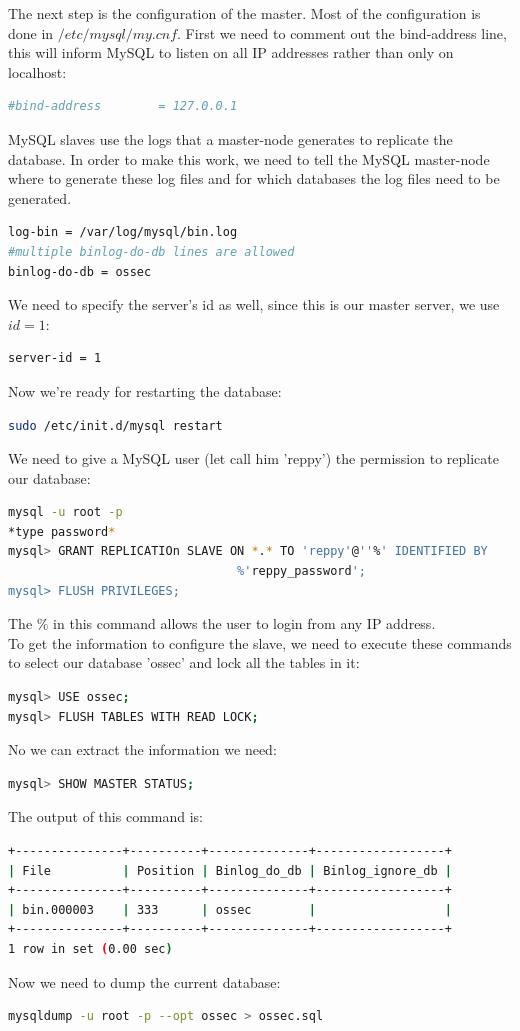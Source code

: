 \documentclass[12pt]{report}
\begin{document}
The next step is the configuration of the master. Most of the
configuration is done in $/etc/mysql/my.cnf$.
First we need to comment out the bind-address line, this will inform MySQL
to listen on all IP addresses rather than only on localhost:
\begin{lstlisting}[language=bash]
#bind-address        = 127.0.0.1
\end{lstlisting}
MySQL slaves use the logs that a master-node generates to replicate
the database. In order to make this work, we need to tell the MySQL
master-node where to
generate these log files and for which databases the log files need to
be generated. 
\begin{lstlisting}[language=bash]
log-bin = /var/log/mysql/bin.log
#multiple binlog-do-db lines are allowed
binlog-do-db = ossec
\end{lstlisting}
We need to specify the server's id as well, since this is our master
server, we use $id=1$:
\begin{lstlisting}[language=bash]
server-id = 1
\end{lstlisting}
Now we're ready for restarting the database:
\begin{lstlisting}[language=bash]
sudo /etc/init.d/mysql restart
\end{lstlisting}
We need to give a MySQL user (let call him 'reppy') the permission to replicate our
database:
\begin{lstlisting}[language=bash]
mysql -u root -p
*type password*
mysql> GRANT REPLICATIOn SLAVE ON *.* TO 'reppy'@''%' IDENTIFIED BY
                                %'reppy_password';
mysql> FLUSH PRIVILEGES;
\end{lstlisting}
The \% in this command allows the user to login from any IP address.\\

To get the information to configure the slave, we need to execute these
commands to select our database 'ossec' and lock all the tables in it:
\begin{lstlisting}[language=bash]
mysql> USE ossec;
mysql> FLUSH TABLES WITH READ LOCK;
\end{lstlisting}
No we can extract the information we need:
\begin{lstlisting}[language=bash]
mysql> SHOW MASTER STATUS;
\end{lstlisting}
The output of this command is:
\begin{lstlisting}[language=bash]
+---------------+----------+--------------+------------------+
| File          | Position | Binlog_do_db | Binlog_ignore_db |
+---------------+----------+--------------+------------------+
| bin.000003    | 333      | ossec        |                  |
+---------------+----------+--------------+------------------+
1 row in set (0.00 sec)
\end{lstlisting}
Now we need to dump the current database:
\begin{lstlisting}[language=bash]
mysqldump -u root -p --opt ossec > ossec.sql
\end{lstlisting}
\end{document}
